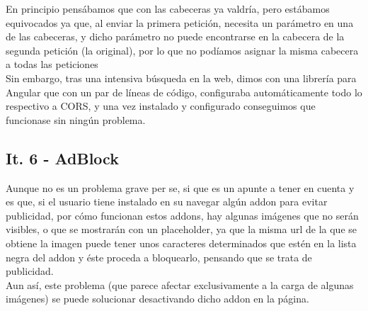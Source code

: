 En principio pensábamos que con las cabeceras ya valdría, pero estábamos equivocados ya que, al enviar la primera petición, necesita un parámetro en una de las cabeceras, y dicho parámetro no puede encontrarse en la cabecera de la segunda petición (la original), por lo que no podíamos asignar la misma cabecera a todas las peticiones\\

Sin embargo, tras una intensiva búsqueda en la web, dimos con una librería para Angular que con un par de líneas de código, configuraba automáticamente todo lo respectivo a CORS, y una vez instalado y configurado conseguimos que funcionase sin ningún problema.\\

\subsection{It. 6 - AdBlock}

Aunque no es un problema grave per se, si que es un apunte a tener en cuenta y es que, si el usuario tiene instalado en su navegar algún addon para evitar publicidad, por cómo funcionan estos addons, hay algunas imágenes que no serán visibles, o que se mostrarán con un placeholder, ya que la misma url de la que se obtiene la imagen puede tener unos caracteres determinados que estén en la lista negra del addon y éste proceda a bloquearlo, pensando que se trata de publicidad.\\

Aun así, este problema (que parece afectar exclusivamente a la carga de algunas imágenes) se puede solucionar desactivando dicho addon en la página.\\





	